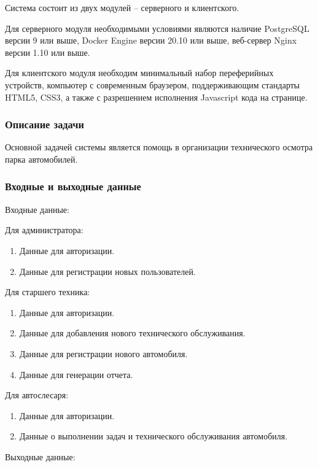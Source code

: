 \documentclass[../nirs.tex]{subfiles}
\begin{document}
    Система состоит из двух модулей -- серверного и клиентского.

    Для серверного модуля необходимыми условиями являются наличие PostgreSQL
    версии 9 или выше, Docker Engine версии 20.10 или выше, веб-сервер Nginx
    версии 1.10 или выше.

    Для клиентского модуля необходим минимальный набор переферийных устройств,
    компьютер с современным браузером,
    поддерживающим стандарты HTML5, CSS3, а также с разрешением исполнения
    Javascript кода на странице.

    \subsubsection*{Описание задачи}

    Основной задачей системы является помощь в организации технического осмотра
    парка автомобилей.

    \subsubsection*{Входные и выходные данные}
    Входные данные:

    Для администратора:
    \begin{enumerate}
        \item Данные для авторизации.
        \item Данные для регистрации новых пользователей.
    \end{enumerate}

    Для старшего техника:
    \begin{enumerate}
        \item Данные для авторизации.
        \item Данные для добавления нового технического обслуживания.
        \item Данные для регистрации нового автомобиля.
        \item Данные для генерации отчета.
    \end{enumerate}

    Для автослесаря:
    \begin{enumerate}
        \item Данные для авторизации.
        \item Данные о выполнении задач и технического обслуживания автомобиля.
    \end{enumerate}

    Выходные данные:
\end{document}

